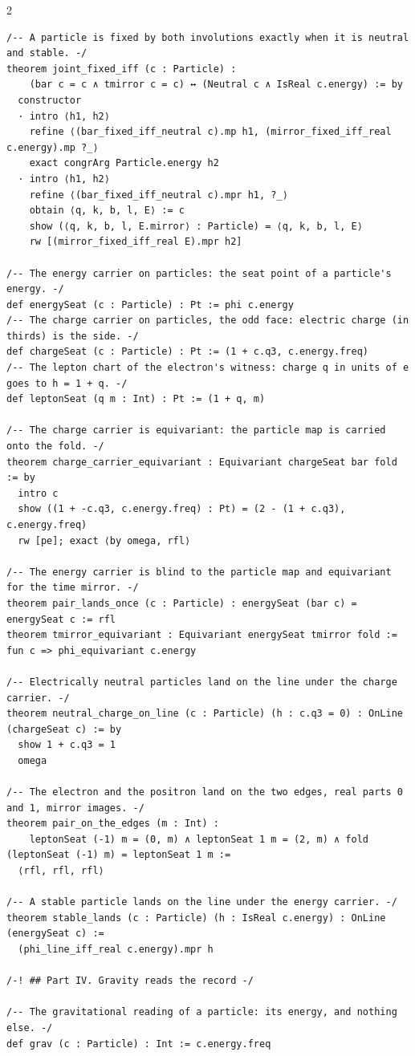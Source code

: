 \documentclass[10pt]{article}
\begin{document}
\begin{multicols}{2}
\begin{Verbatim}[fontsize=\fontsize{5.9}{6.8}\selectfont,breaklines,breakanywhere,breaksymbolleft={}]
/-- A particle is fixed by both involutions exactly when it is neutral and stable. -/
theorem joint_fixed_iff (c : Particle) :
    (bar c = c ∧ tmirror c = c) ↔ (Neutral c ∧ IsReal c.energy) := by
  constructor
  · intro ⟨h1, h2⟩
    refine ⟨(bar_fixed_iff_neutral c).mp h1, (mirror_fixed_iff_real c.energy).mp ?_⟩
    exact congrArg Particle.energy h2
  · intro ⟨h1, h2⟩
    refine ⟨(bar_fixed_iff_neutral c).mpr h1, ?_⟩
    obtain ⟨q, k, b, l, E⟩ := c
    show (⟨q, k, b, l, E.mirror⟩ : Particle) = ⟨q, k, b, l, E⟩
    rw [(mirror_fixed_iff_real E).mpr h2]

/-- The energy carrier on particles: the seat point of a particle's energy. -/
def energySeat (c : Particle) : Pt := phi c.energy
/-- The charge carrier on particles, the odd face: electric charge (in thirds) is the side. -/
def chargeSeat (c : Particle) : Pt := (1 + c.q3, c.energy.freq)
/-- The lepton chart of the electron's witness: charge q in units of e goes to h = 1 + q. -/
def leptonSeat (q m : Int) : Pt := (1 + q, m)

/-- The charge carrier is equivariant: the particle map is carried onto the fold. -/
theorem charge_carrier_equivariant : Equivariant chargeSeat bar fold := by
  intro c
  show ((1 + -c.q3, c.energy.freq) : Pt) = (2 - (1 + c.q3), c.energy.freq)
  rw [pe]; exact ⟨by omega, rfl⟩

/-- The energy carrier is blind to the particle map and equivariant for the time mirror. -/
theorem pair_lands_once (c : Particle) : energySeat (bar c) = energySeat c := rfl
theorem tmirror_equivariant : Equivariant energySeat tmirror fold := fun c => phi_equivariant c.energy

/-- Electrically neutral particles land on the line under the charge carrier. -/
theorem neutral_charge_on_line (c : Particle) (h : c.q3 = 0) : OnLine (chargeSeat c) := by
  show 1 + c.q3 = 1
  omega

/-- The electron and the positron land on the two edges, real parts 0 and 1, mirror images. -/
theorem pair_on_the_edges (m : Int) :
    leptonSeat (-1) m = (0, m) ∧ leptonSeat 1 m = (2, m) ∧ fold (leptonSeat (-1) m) = leptonSeat 1 m :=
  ⟨rfl, rfl, rfl⟩

/-- A stable particle lands on the line under the energy carrier. -/
theorem stable_lands (c : Particle) (h : IsReal c.energy) : OnLine (energySeat c) :=
  (phi_line_iff_real c.energy).mpr h

/-! ## Part IV. Gravity reads the record -/

/-- The gravitational reading of a particle: its energy, and nothing else. -/
def grav (c : Particle) : Int := c.energy.freq


\end{Verbatim}
\end{multicols}
\end{document}
